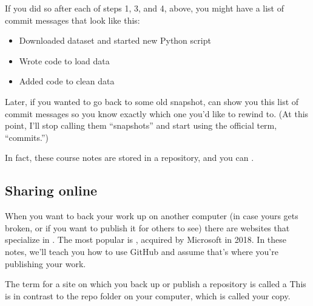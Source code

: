 \documentclass[letterpaper,10pt,english]{jupyterBook}
\begin{document}
\sphinxAtStartPar
If you did so after each of steps 1, 3, and 4, above, you might have a list of commit messages that look like this:
\begin{itemize}
\item {} 
\sphinxAtStartPar
Downloaded dataset and started new Python script

\item {} 
\sphinxAtStartPar
Wrote code to load data

\item {} 
\sphinxAtStartPar
Added code to clean data

\end{itemize}

\sphinxAtStartPar
Later, if you wanted to go back to some old snapshot,  can show you this list of commit messages so you know exactly which one you’d like to rewind to.  (At this point, I’ll stop calling them “snapshots” and start using the official term, “commits.”)

\sphinxAtStartPar
In fact, these course notes are stored in a  repository, and you can .


\subsection{Sharing online}
\label{\detokenize{chapter-8-version-control:sharing-online}}
\sphinxAtStartPar
When you want to back your work up on another computer (in case yours gets broken, or if you want to publish it for others to see) there are websites that specialize in .  The most popular is , acquired by Microsoft in 2018.  In these notes, we’ll teach you how to use GitHub and assume that’s where you’re publishing your work.

\sphinxAtStartPar
The  term for a site on which you back up or publish a repository is called a   This is in contrast to the repo folder on your computer, which is called your  copy.
\end{document}

